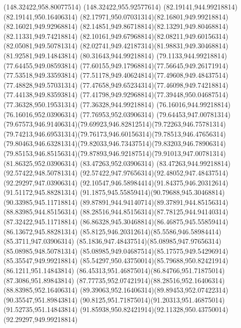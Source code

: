 {{	\lineto(148.32422,958.80077514)
	\lineto(148.32422,955.92577614)
	\closepath
	\moveto(82.19141,944.99218814)
	\lineto(82.19141,950.16406314)
	\curveto(82.17971,950.07031314)(82.16801,949.99218814)(82.16021,949.92968814)
	\curveto(82.14851,949.86718814)(82.13291,949.80468814)(82.11331,949.74218814)
	\curveto(82.10161,949.67968814)(82.08211,949.60156314)(82.05081,949.50781314)
	\curveto(82.02741,949.42187314)(81.98831,949.30468814)(81.92581,949.14843814)
	\lineto(80.31643,944.99218814)
	\lineto(79.1133,944.99218814)
	\lineto(77.64455,949.08593814)
	\curveto(77.60155,949.17968814)(77.56645,949.26171914)(77.53518,949.33593814)
	\curveto(77.51178,949.40624814)(77.49608,949.48437514)(77.48828,949.57031314)
	\curveto(77.47658,949.65234314)(77.46098,949.74218814)(77.44138,949.83593814)
	\curveto(77.41798,949.92968814)(77.39448,950.04687514)(77.36328,950.19531314)
	\lineto(77.36328,944.99218814)
	\lineto(76.16016,944.99218814)
	\lineto(76.16016,952.03906314)
	\lineto(77.76953,952.03906314)
	\lineto(79.64453,947.00781314)
	\curveto(79.67573,946.91406314)(79.69923,946.82812514)(79.72263,946.75781314)
	\curveto(79.74213,946.69531314)(79.76173,946.60156314)(79.78513,946.47656314)
	\curveto(79.80463,946.63281314)(79.82033,946.73437514)(79.83203,946.78906314)
	\curveto(79.85153,946.85156314)(79.87893,946.92187514)(79.91013,947.00781314)
	\lineto(81.86325,952.03906314)
	\lineto(83.47263,952.03906314)
	\lineto(83.47263,944.99218814)
	\closepath
	\moveto(92.57422,948.50781314)
	\curveto(92.57422,947.97656314)(92.48052,947.48437514)(92.29297,947.03906314)
	\curveto(92.10547,946.58984414)(91.84375,946.20312614)(91.51172,945.88281314)
	\curveto(91.1875,945.55859414)(90.79688,945.30468814)(90.33985,945.11718814)
	\curveto(89.87891,944.94140714)(89.37891,944.85156314)(88.83985,944.85156314)
	\curveto(88.28516,944.85156314)(87.78125,944.94140314)(87.32422,945.11718814)
	\curveto(86.86328,945.30468814)(86.46875,945.55859414)(86.13672,945.88281314)
	\curveto(85.8125,946.20312614)(85.5586,946.58984414)(85.3711,947.03906314)
	\curveto(85.1836,947.48437514)(85.08985,947.97656314)(85.08985,948.50781314)
	\curveto(85.08985,949.04687514)(85.17575,949.54296914)(85.35547,949.99218814)
	\curveto(85.54297,950.43750014)(85.79688,950.82421914)(86.1211,951.14843814)
	\curveto(86.45313,951.46875014)(86.84766,951.71875014)(87.3086,951.89843814)
	\curveto(87.77735,952.07421914)(88.28516,952.16406314)(88.83985,952.16406314)
	\curveto(89.39063,952.16406314)(89.89453,952.07422314)(90.35547,951.89843814)
	\curveto(90.8125,951.71875014)(91.20313,951.46875014)(91.52735,951.14843814)
	\curveto(91.85938,950.82421914)(92.11328,950.43750014)(92.29297,949.99218814)
}}
